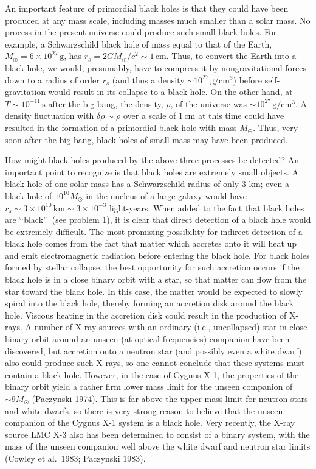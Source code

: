 An important feature of primordial black holes is that they could have been produced
at any mass scale, including masses much smaller than a solar mass. No process in
the present universe could produce such small black holes. For example, a
Schwarzschild black hole of mass equal to that of the Earth,
\(M_\oplus=6\times10^{27}\,\mathrm{g}\), has \(r_s=2GM_\oplus/c^2\sim1\,\mathrm{cm}\).
Thus, to convert the Earth into a black hole, we would, presumably, have to compress
it by nongravitational forces down to a radius of order \(r_s\) (and thus a density
\(\sim10^{27}\,\mathrm{g/cm^3}\)) before self-gravitation would result in its collapse
to a black hole. On the other hand, at \(T\sim10^{-11}\,\mathrm{s}\) after the big bang,
the density, \(\rho\), of the universe was \(\sim10^{27}\,\mathrm{g/cm^3}\). A density
fluctuation with \(\delta\rho\sim\rho\) over a scale of \(1\,\mathrm{cm}\) at this time
could have resulted in the formation of a primordial black hole with mass
\(M_\oplus\). Thus, very soon after the big bang, black holes of small mass may have
been produced.

How might black holes produced by the above three processes be detected? An
important point to recognize is that black holes are extremely small objects. A black
hole of one solar mass has a Schwarzschild radius of only 3 km; even a black hole
of \(10^{10}M_\odot\) in the nucleus of a large galaxy would have
\(r_s\sim3\times10^{10}\,\mathrm{km}\sim3\times10^{-3}\) light-years. When added to
the fact that black holes are \lq\lq black\rq\rq\ (see problem 1), it is clear that direct
detection of a black hole would be extremely difficult. The most promising
possibility for indirect detection of a black hole comes from the fact that matter
which accretes onto it will heat up and emit electromagnetic radiation before entering
the black hole. For black holes formed by stellar collapse, the best opportunity for
such accretion occurs if the black hole is in a close binary orbit with a star, so that
matter can flow from the star toward the black hole. In this case, the matter would be
expected to slowly spiral into the black hole, thereby forming an accretion disk around
the black hole. Viscous heating in the accretion disk could result in the production of
X-rays. A number of X-ray sources with an ordinary (i.e., uncollapsed) star in close
binary orbit around an unseen (at optical frequencies) companion have been
discovered, but accretion onto a neutron star (and possibly even a white dwarf) also
could produce such X-rays, so one cannot conclude that these systems must contain a
black hole. However, in the case of Cygnus X-1, the properties of the binary orbit
yield a rather firm lower mass limit for the unseen companion of \(\sim9M_\odot\)
(Paczynski 1974). This is far above the upper mass limit for neutron stars and white
dwarfs, so there is very strong reason to believe that the unseen companion of the
Cygnus X-1 system is a black hole. Very recently, the X-ray source LMC X-3 also
has been determined to consist of a binary system, with the mass of the unseen
companion well above the white dwarf and neutron star limits (Cowley et al.\ 1983;
Paczynski 1983).


